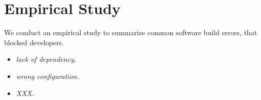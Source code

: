 
\section{Empirical Study}\label{motivation}

We conduct an empirical study to summarize common software build errors, that blocked developers.


\begin{itemize}
    \item \textit{lack of dependency.}
    \item \textit{wrong configuration.}
    \item \textit{XXX.}
\end{itemize}